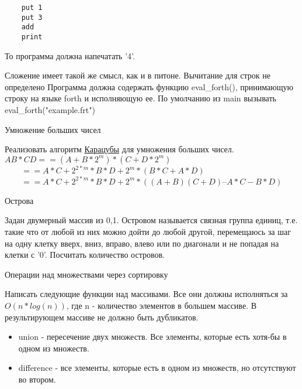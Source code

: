 \documentclass{article}
\begin{document}
\begin{lstlisting}
    put 1
    put 3
    add
    print
\end{lstlisting}

    То программа должна напечатать '4'. 

    Сложение имеет такой же смысл, как и в питоне. Вычитание для строк не определено
    Программа должна содержать функцию eval\_forth(), принимающую строку на языке forth и исполняющую ее. 
    По умолчанию из main вызывать eval\_forth("example.frt")
\newpage

\begin{center} Умножение больших чисел \end{center}
Реализовать алгоритм 
\href{http://ru.wikipedia.org/wiki/%D0%A3%D0%BC%D0%BD%D0%BE%D0%B6%D0%B5%D0%BD%D0%B8%D0%B5_%D0%9A%D0%B0%D1%80%D0%B0%D1%86%D1%83%D0%B1%D1%8B}
{Карацубы} 
для умножения больших чисел. \\
$AB * CD == (A + B * 2^m) * (C + D * 2^m)$ \\ 
$ \qquad == A * C + 2^{2*m} * B * D + 2^m * (B * C + A * D)$ \\
$ \qquad == A * C + 2^{2*m} * B * D + 2^m * ((A + B)(C + D) – A * C - B * D) $
\newpage

\begin{center} Острова \end{center}
Задан двумерный массив из {0,1}. Островом называется связная группа единиц,
т.е. такие что от любой из них можно дойти до любой другой, перемещаюсь за шаг
на одну клетку вверх, вниз, вправо, влево или по диагонали и не попадая на 
клетки с '0'. Посчитать количество островов.
\newpage

\begin{center} Операции над множествами через сортировку \end{center}
Написать следующие функции над массивами. Все они должны исполняться за
$O(n * log(n))$, где n - количество элементов в большем массиве.
В результирующем массиве не должно быть дубликатов.
\begin{itemize}
    \item union - пересечение двух множеств. Все элементы, которые есть 
          хотя-бы в одном из множеств.
    \item difference - все элементы, которые есть в одном из множеств, 
          но отсутствуют во втором.
\end{itemize}
\newpage
\end{document}
